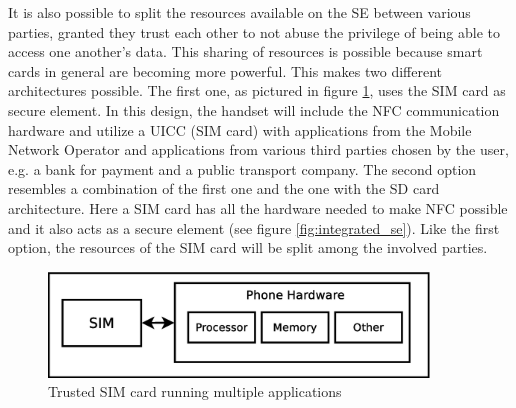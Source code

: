 \begin{enumerate}
\begin{item}
It is also possible to split the resources available on the SE between various parties, granted they trust each other to not abuse the privilege of being able to access one another's data.
This sharing of resources is possible because smart cards in general are becoming more powerful.
This makes two different architectures possible.
The first one, as pictured in figure \ref{fig:sim_se}, uses the SIM card as secure element.
In this design, the handset will include the NFC communication hardware and utilize a UICC (SIM card) with applications from the Mobile Network Operator and applications from various third parties chosen by the user, e.g. a bank for payment and a public transport company. 
The second option resembles a combination of the first one and the one with the SD card architecture.
Here a SIM card has all the hardware needed to make NFC possible and it also acts as a secure element (see figure \ref{fig:integrated_se}).
Like the first option, the resources of the SIM card will be split among the involved parties.
\begin{figure}
\includegraphics[width=0.9\textwidth]{images/SIM_is_SE}
\caption[Trusted SIM cards]
{
Trusted SIM card running multiple applications
}
\label{fig:sim_se}
\end{figure}
\end{item}

\end{enumerate}







